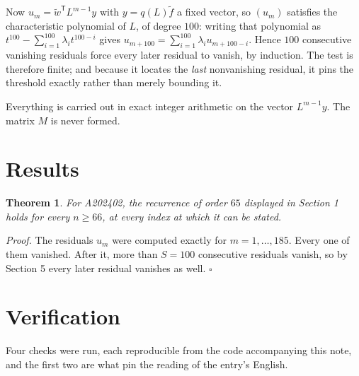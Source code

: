 \documentclass[11pt]{article}
\newtheorem{theorem}{Theorem}
\theoremstyle{definition}
\begin{document}
Now $u_m = \tilde w^{\mathsf T} L^{m-1} y$ with $y = q(L)\tilde f$ a fixed vector, so $(u_m)$ satisfies the characteristic polynomial of $L$, of degree $100$: writing that polynomial as $t^{100} - \sum_{i=1}^{100} \lambda_i t^{100-i}$ gives $u_{m+100} = \sum_{i=1}^{100} \lambda_i u_{m+100-i}$. Hence $100$ consecutive vanishing residuals force every later residual to vanish, by induction. The test is therefore finite; and because it locates the {\itshape last} nonvanishing residual, it pins the threshold exactly rather than merely bounding it.

Everything is carried out in exact integer arithmetic on the vector $L^{m-1}y$. The matrix $M$ is never formed.

\section{Results}

\begin{theorem} For A202402, the recurrence of order $65$ displayed in Section 1 holds for every $n \ge 66$, at every index at which it can be stated.\end{theorem}

{\itshape Proof.} The residuals $u_m$ were computed exactly for $m = 1,\dots,185$. Every one of them vanished. After it, more than $S = 100$ consecutive residuals vanish, so by Section 5 every later residual vanishes as well. $\square$

\section{Verification}

Four checks were run, each reproducible from the code accompanying this note, and the first two are what pin the reading of the entry's English.
\end{document}
